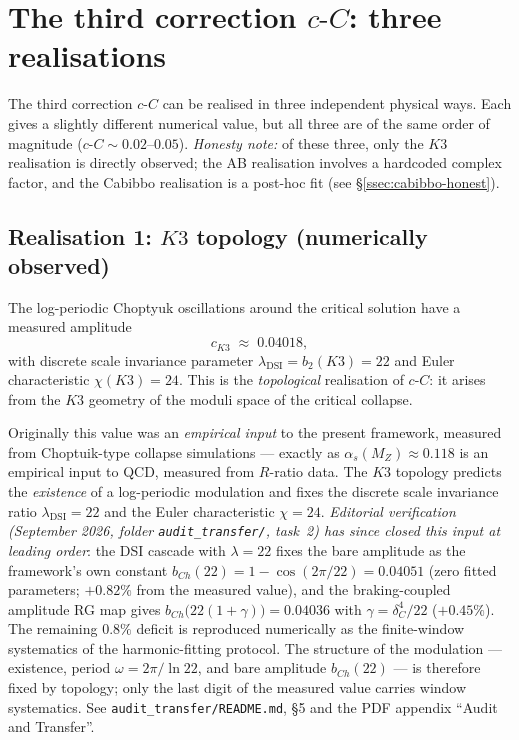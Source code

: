\documentclass[11pt,a4paper]{article}
\newcommand{\cC}{c\text{-}C}
\theoremstyle{plain}
\theoremstyle{definition}
\theoremstyle{remark}
\begin{document}
\section{The third correction $\cC$: three realisations}
\label{sec:third-correction}

The third correction $\cC$ can be realised in three independent
physical ways.  Each gives a slightly different numerical value, but
all three are of the same order of magnitude ($\cC \sim 0.02\text{--}
0.05$).  \emph{Honesty note:} of these three, only the $K3$ realisation
is directly observed; the AB realisation involves a hardcoded complex
factor, and the Cabibbo realisation is a post-hoc fit (see
\S\ref{ssec:cabibbo-honest}).

\subsection{Realisation 1: $K3$ topology (numerically observed)}
\label{ssec:k3}

The log-periodic Choptyuk oscillations around the critical solution
have a measured amplitude
\begin{equation}\label{eq:c-K3}
  c_{K3} \;\approx\; 0.04018,
\end{equation}
with discrete scale invariance parameter
$\lambda_{\mathrm{DSI}} = b_2(K3) = 22$ and Euler characteristic
$\chi(K3) = 24$.  This is the \emph{topological} realisation of
$\cC$: it arises from the $K3$ geometry of the moduli space of the
critical collapse.

\begin{caveat}[Status of \texorpdfstring{$c_{K3} = 0.04018$}{c\_K3 = 0.04018}]
Originally this value was an \emph{empirical input} to the present
framework, measured from Choptuik-type collapse simulations --- exactly
as $\alpha_s(M_Z) \approx 0.118$ is an empirical input to QCD, measured
from $R$-ratio data.  The $K3$ topology predicts the \emph{existence} of
a log-periodic modulation and fixes the discrete scale invariance ratio
$\lambda_{\mathrm{DSI}} = 22$ and the Euler characteristic $\chi = 24$.
\emph{Editorial verification (September 2026, folder
\texttt{audit\_transfer/}, task~2) has since closed this input at
leading order}: the DSI cascade with $\lambda = 22$ fixes the bare
amplitude as the framework's own constant
$b_{Ch}(22) = 1 - \cos(2\pi/22) = 0.04051$ (zero fitted parameters;
$+0.82\%$ from the measured value), and the braking-coupled amplitude RG
map gives $b_{Ch}\bigl(22(1+\gamma)\bigr) = 0.04036$ with
$\gamma = \delta_C^4/22$ ($+0.45\%$).  The remaining $0.8\%$ deficit is
reproduced numerically as the finite-window systematics of the
harmonic-fitting protocol.  The structure of the modulation ---
existence, period $\omega = 2\pi/\ln 22$, and bare amplitude
$b_{Ch}(22)$ --- is therefore fixed by topology; only the last digit of
the measured value carries window systematics.  See
\texttt{audit\_transfer/README.md}, \S5 and the PDF appendix
``Audit and Transfer''.
\end{caveat}
\end{document}

